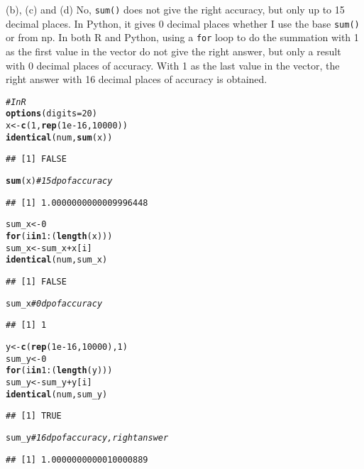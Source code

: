 \documentclass{article}\usepackage[]{graphicx}\usepackage[]{color}
\makeatletter
\newcommand{\hlnum}[1]{\textcolor[rgb]{0.686,0.059,0.569}{#1}}%
\newcommand{\hlcom}[1]{\textcolor[rgb]{0.678,0.584,0.686}{\textit{#1}}}%
\newcommand{\hlopt}[1]{\textcolor[rgb]{0,0,0}{#1}}%
\newcommand{\hlstd}[1]{\textcolor[rgb]{0.345,0.345,0.345}{#1}}%
\newcommand{\hlkwa}[1]{\textcolor[rgb]{0.161,0.373,0.58}{\textbf{#1}}}%
\newcommand{\hlkwb}[1]{\textcolor[rgb]{0.69,0.353,0.396}{#1}}%
\newcommand{\hlkwc}[1]{\textcolor[rgb]{0.333,0.667,0.333}{#1}}%
\newcommand{\hlkwd}[1]{\textcolor[rgb]{0.737,0.353,0.396}{\textbf{#1}}}%
\newenvironment{kframe}{%
 \def\at@end@of@kframe{}%
 \ifinner\ifhmode%
  \def\at@end@of@kframe{\end{minipage}}%
  \begin{minipage}{\columnwidth}%
 \fi\fi%
 \def\FrameCommand##1{\hskip\@totalleftmargin \hskip-\fboxsep
 \colorbox{shadecolor}{##1}\hskip-\fboxsep
     \hskip-\linewidth \hskip-\@totalleftmargin \hskip\columnwidth}%
 \MakeFramed {\advance\hsize-\width
   \@totalleftmargin\z@ \linewidth\hsize
   \@setminipage}}%
 {\par\unskip\endMakeFramed%
 \at@end@of@kframe}
\newenvironment{knitrout}{}{} %
\makeatother
\begin{document}
(b), (c) and (d)
No, \texttt{sum()} does not give the right accuracy, but only up to 15 decimal places. In Python, it gives 0 decimal places whether I use the base \texttt{sum()} or from np. In both R and Python, using a \texttt{for} loop to do the summation with 1 as the first value in the vector do not give the right answer, but only a result with 0 decimal places of accuracy. With 1 as the last value in the vector, the right answer with 16 decimal places of accuracy is obtained.

\begin{knitrout}
\color{fgcolor}\begin{kframe}
\begin{alltt}
\hlcom{# In R}
\hlkwd{options}\hlstd{(}\hlkwc{digits} \hlstd{=} \hlnum{20}\hlstd{)}
\hlstd{x} \hlkwb{<-} \hlkwd{c}\hlstd{(}\hlnum{1}\hlstd{,} \hlkwd{rep}\hlstd{(}\hlnum{1e-16}\hlstd{,} \hlnum{10000}\hlstd{))}
\hlkwd{identical}\hlstd{(num,} \hlkwd{sum}\hlstd{(x))}
\end{alltt}
\begin{verbatim}
## [1] FALSE
\end{verbatim}
\begin{alltt}
\hlkwd{sum}\hlstd{(x)} \hlcom{# 15 dp of accuracy}
\end{alltt}
\begin{verbatim}
## [1] 1.0000000000009996448
\end{verbatim}
\begin{alltt}
\hlstd{sum_x} \hlkwb{<-} \hlnum{0}
\hlkwa{for} \hlstd{(i} \hlkwa{in} \hlnum{1}\hlopt{:}\hlstd{(}\hlkwd{length}\hlstd{(x)))}
  \hlstd{sum_x} \hlkwb{<-} \hlstd{sum_x} \hlopt{+} \hlstd{x[i]}
\hlkwd{identical}\hlstd{(num, sum_x)}
\end{alltt}
\begin{verbatim}
## [1] FALSE
\end{verbatim}
\begin{alltt}
\hlstd{sum_x} \hlcom{# 0 dp of accuracy}
\end{alltt}
\begin{verbatim}
## [1] 1
\end{verbatim}
\begin{alltt}
\hlstd{y} \hlkwb{<-} \hlkwd{c}\hlstd{(}\hlkwd{rep}\hlstd{(}\hlnum{1e-16}\hlstd{,} \hlnum{10000}\hlstd{),} \hlnum{1}\hlstd{)}
\hlstd{sum_y} \hlkwb{<-} \hlnum{0}
\hlkwa{for} \hlstd{(i} \hlkwa{in} \hlnum{1}\hlopt{:}\hlstd{(}\hlkwd{length}\hlstd{(y)))}
  \hlstd{sum_y} \hlkwb{<-} \hlstd{sum_y} \hlopt{+} \hlstd{y[i]}
\hlkwd{identical}\hlstd{(num, sum_y)}
\end{alltt}
\begin{verbatim}
## [1] TRUE
\end{verbatim}
\begin{alltt}
\hlstd{sum_y} \hlcom{# 16 dp of accuracy, right answer}
\end{alltt}
\begin{verbatim}
## [1] 1.0000000000010000889
\end{verbatim}
\end{kframe}
\end{knitrout}
\end{document}
